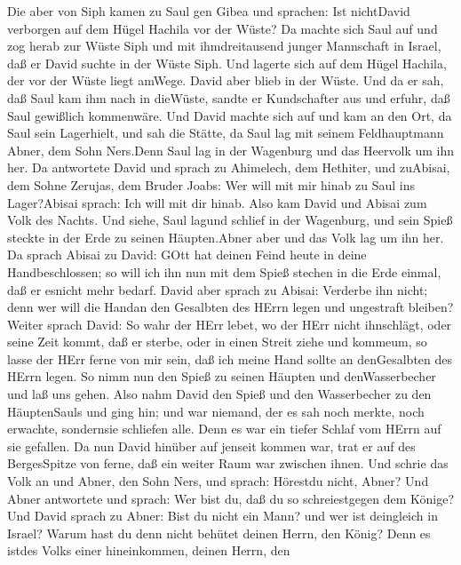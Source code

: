  Die aber von Siph kamen zu Saul gen Gibea und sprachen: Ist
nichtDavid verborgen auf dem Hügel Hachila vor der Wüste? 
Da machte sich Saul auf und zog herab zur Wüste Siph und mit
ihmdreitausend junger Mannschaft in Israel, daß er David suchte in der
Wüste Siph.  Und lagerte sich auf dem Hügel Hachila, der vor
der Wüste liegt amWege. David aber blieb in der Wüste. Und da er sah,
daß Saul kam ihm nach in dieWüste,  sandte er Kundschafter
aus und erfuhr, daß Saul gewißlich kommenwäre.  Und David
machte sich auf und kam an den Ort, da Saul sein Lagerhielt, und sah die
Stätte, da Saul lag mit seinem Feldhauptmann Abner, dem Sohn Ners.Denn
Saul lag in der Wagenburg und das Heervolk um ihn her.  Da
antwortete David und sprach zu Ahimelech, dem Hethiter, und zuAbisai,
dem Sohne Zerujas, dem Bruder Joabs: Wer will mit mir hinab zu Saul ins
Lager?Abisai sprach: Ich will mit dir hinab.  Also kam David
und Abisai zum Volk des Nachts. Und siehe, Saul lagund schlief in der
Wagenburg, und sein Spieß steckte in der Erde zu seinen Häupten.Abner
aber und das Volk lag um ihn her.  Da sprach Abisai zu
David: GOtt hat deinen Feind heute in deine Handbeschlossen; so will ich
ihn nun mit dem Spieß stechen in die Erde einmal, daß er esnicht mehr
bedarf.  David aber sprach zu Abisai: Verderbe ihn nicht;
denn wer will die Handan den Gesalbten des HErrn legen und ungestraft
bleiben?  Weiter sprach David: So wahr der HErr lebet, wo
der HErr nicht ihnschlägt, oder seine Zeit kommt, daß er sterbe, oder in
einen Streit ziehe und kommeum,  so lasse der HErr ferne
von mir sein, daß ich meine Hand sollte an denGesalbten des HErrn legen.
So nimm nun den Spieß zu seinen Häupten und denWasserbecher und laß uns
gehen.  Also nahm David den Spieß und den Wasserbecher zu
den HäuptenSauls und ging hin; und war niemand, der es sah noch merkte,
noch erwachte, sondernsie schliefen alle. Denn es war ein tiefer Schlaf
vom HErrn auf sie gefallen.  Da nun David hinüber auf
jenseit kommen war, trat er auf des BergesSpitze von ferne, daß ein
weiter Raum war zwischen ihnen.  Und schrie das Volk an und
Abner, den Sohn Ners, und sprach: Hörestdu nicht, Abner? Und Abner
antwortete und sprach: Wer bist du, daß du so schreiestgegen dem Könige?
 Und David sprach zu Abner: Bist du nicht ein Mann? und wer
ist deingleich in Israel? Warum hast du denn nicht behütet deinen Herrn,
den König? Denn es istdes Volks einer hineinkommen, deinen Herrn, den
